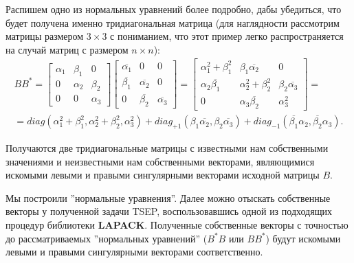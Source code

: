 Распишем одно из нормальных уравнений более подробно, дабы убедиться, что будет получена именно тридиагональная матрица (для наглядности рассмотрим матрицы размером $3\times 3$ с пониманием, что этот пример легко распространяется на случай матриц с размером $n\times n$):
\begin{equation*}
    \begin{split}
        BB^*=\begin{bmatrix}
            \alpha_1 & \beta_1 & 0\\
            0 & \alpha_2 & \beta_2 \\
            0 & 0 & \alpha_3  
        \end{bmatrix}\begin{bmatrix}
            \overline{\alpha_1} & 0 & 0\\
            \overline{\beta_1} & \overline{\alpha_2} & 0 \\
            0 & \overline{\beta_2} & \overline{\alpha_3}  
        \end{bmatrix} =
        \begin{bmatrix}
            \alpha_1^2+\beta^2_1 & \beta_1 \overline{\alpha_2} & 0 \\
            \alpha_2 \overline{\beta_1} & \alpha_2^2+\beta_2^2 & \beta_2 \overline{\alpha_3} \\
            0 & \alpha_3 \overline{\beta_2} & \alpha_3^2
        \end{bmatrix} =\\[6pt]= diag(\alpha_1^2+\beta^2_1, \alpha_2^2+\beta^2_2,\alpha_3^2)+diag_{+1}(\beta_1 \overline{\alpha_2},\beta_2 \overline{\alpha_3})+diag_{-1}(\overline{\beta_1} \alpha_2,\overline{\beta_2} \alpha_3).
    \end{split}
\end{equation*}

Получаются две тридиагональные матрицы с известными нам собственными значениями и неизвестными нам собственными векторами, являющимися искомыми левыми и правыми сингулярными векторами исходной матрицы $B$.

Мы построили ''нормальные уравнения''. Далее можно отыскать собственные векторы у полученной задачи TSEP, воспользовавшись одной из подходящих процедур библиотеки \textbf{LAPACK}. Полученные собственные векторы с точностью до рассматриваемых ''нормальных уравнений'' (\(B^*B\) или \(BB^*\)) будут искомыми левыми и правыми сингулярными векторами соответственно.

